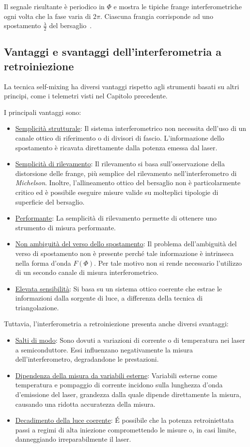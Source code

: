 Il segnale risultante è periodico in $\Phi$ e mostra le tipiche frange interferometriche ogni volta che la fase varia di $2\pi$. Ciascuna frangia corrisponde ad uno spostamento $\frac{\lambda}{2}$ del bersaglio~\cite{341714}.

\subsection{Vantaggi e svantaggi dell'interferometria a retroiniezione}
La tecnica self-mixing ha diversi vantaggi rispetto agli strumenti basati su altri principi, come i telemetri visti nel Capitolo precedente.

I principali vantaggi sono:
\begin{itemize}
	\item \underline{Semplicità strutturale}: Il sistema interferometrico non necessita dell'uso di un canale ottico di riferimento o di divisori di fascio. L'informazione dello spostamento è ricavata direttamente dalla potenza emessa dal laser.
	\item \underline{Semplicità di rilevamento}: Il rilevamento si basa sull'osservazione della distorsione delle frange, più semplice del rilevamento nell'interferometro di \textit{Michelson}. Inoltre, l'allineamento ottico del bersaglio non è particolarmente critico ed è possibile eseguire misure valide su molteplici tipologie di superficie del bersaglio.
	\item \underline{Performante}: La semplicità di rilevamento permette di ottenere uno strumento di misura performante.
	\item \underline{Non ambiguità del verso dello spostamento}: Il problema dell'ambiguità del verso di spostamento non è presente perché tale informazione è intrinseca nella forma d'onda $F(\Phi)$. Per tale motivo non si rende necessario l'utilizzo di un secondo canale di misura interferometrico. 
	\item \underline{Elevata sensibilità}: Si basa su un sistema ottico coerente che estrae le informazioni dalla sorgente di luce, a differenza della tecnica di triangolazione.
\end{itemize}
Tuttavia, l'interferometria a retroiniezione presenta anche diversi svantaggi:
\begin{itemize}
	\item \underline{Salti di modo}: Sono dovuti a variazioni di corrente o di temperatura nei laser a semiconduttore. Essi influenzano negativamente la misura dell'interferometro, degradandone le prestazioni.
	\item \underline{Dipendenza della misura da variabili esterne}: Variabili esterne come temperatura e pompaggio di corrente incidono sulla lunghezza d'onda d'emissione del laser, grandezza dalla quale dipende direttamente la misura, causando una ridotta accuratezza della misura.
	\item \underline{Decadimento della luce coerente}: \'E possibile che la potenza retroiniettata passi a regimi di alta iniezione compromettendo le misure o, in casi limite, danneggiando irreparabilmente il laser. 
\end{itemize}

